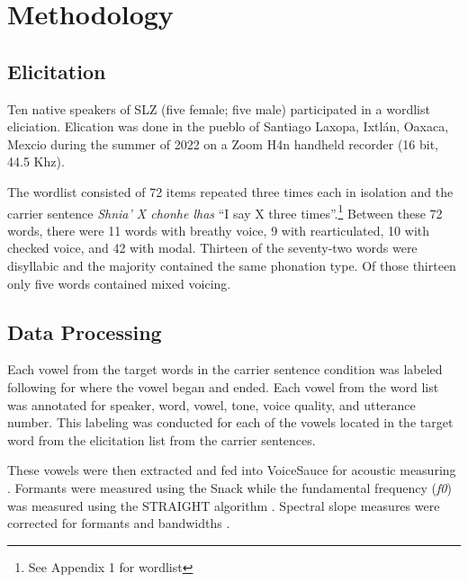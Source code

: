 \documentclass[12pt, letterpaper]{article}
\begin{document}
\section{Methodology} \label{sec:Methods}

\subsection{Elicitation} \label{sec:Elicitation}
Ten native speakers of SLZ (five female; five male) participated in a wordlist eliciation. Elication was done in the pueblo of Santiago Laxopa, Ixtlán, Oaxaca, Mexcio during the summer of 2022 on a Zoom H4n handheld recorder (16 bit, 44.5 Khz). 

The wordlist consisted of 72 items repeated three times each in isolation and the carrier sentence \textit{Shnia' X chonhe lhas} ``I say X three times''.\footnote{See Appendix 1 for wordlist} Between these 72 words, there were 11 words with breathy voice, 9 with rearticulated, 10 with checked voice, and 42 with modal. Thirteen of the seventy-two words were disyllabic and the majority contained the same phonation type. Of those thirteen only five words contained mixed voicing.

\subsection{Data Processing} \label{sec:Processing}

Each vowel from the target words in the carrier sentence condition was labeled following \citet{garellekAcousticDiscriminabilityComplex2020} for where the vowel began and ended. Each vowel from the word list was annotated for speaker, word, vowel, tone, voice quality, and utterance number. This labeling was conducted for each of the vowels located in the target word from the elicitation list from the carrier sentences.

These vowels were then extracted and fed into VoiceSauce for acoustic measuring \citep{shueVOICESAUCEProgramVoice2009}. Formants were measured using the Snack \citep{sjolanderSnackSoundToolkit2004} while the fundamental frequency (\textit{f0}) was measured using the STRAIGHT algorithm \citep{kawaharaInstantaneousfrequencybasedPitchExtraction1998}. Spectral slope measures were corrected for formants and bandwidths \citep{hansonGlottalCharacteristicsFemale1997,iseliAgeSexVowel2007}.
\end{document}
